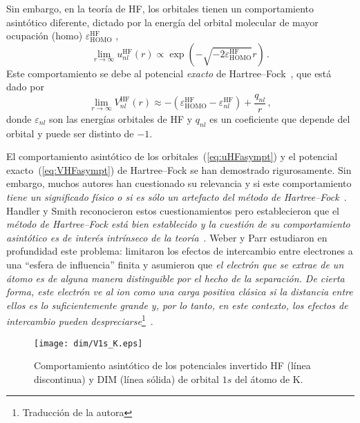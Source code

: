 Sin embargo, en la teoría de HF, los orbitales tienen un comportamiento 
asintótico diferente, dictado por la energía del orbital molecular de 
mayor ocupación (\acs{homo}) $\varepsilon_{\mathrm{HOMO}}^{\mathrm{HF}}$ 
\cite{Handy:69,Handler:80,Ishida:92},
\begin{equation}
\lim_{r \rightarrow \infty} u_{nl}^{\mathrm{HF}}(r) \propto
\exp(- \sqrt{- 2 \varepsilon_{\mathrm{HOMO}}^{\mathrm{HF}} } r )  \, .
\label{eq:uHFasympt}
\end{equation}
Este comportamiento se debe al potencial \textit{exacto} de 
Hartree--Fock~\cite{Cinal:10}, que está dado por
\begin{equation}
\lim_{r\rightarrow\infty} V_{nl}^{\mathrm{HF}}(r) \approx
-\left(\varepsilon_{\mathrm{HOMO}}^{\mathrm{HF}}
-\varepsilon_{nl}^{\mathrm{HF}}\right)+\frac{q_{nl}}{r}\,,
\label{eq:VHFasympt}
\end{equation}
donde $\varepsilon_{nl}$ son las energías orbitales de HF y $q_{nl}$ es 
un coeficiente que depende del orbital y puede ser distinto de $-1$.

El comportamiento asintótico de los orbitales~(\ref{eq:uHFasympt}) y el 
potencial exacto~(\ref{eq:VHFasympt}) de Hartree--Fock se han demostrado 
rigurosamente. Sin embargo, muchos autores han cuestionado su relevancia 
y si este comportamiento \textit{tiene un significado físico o si es 
sólo un artefacto del método de Hartree--Fock}\myfnote{}~\cite{Handy:69}. 
Handler y Smith reconocieron estos cuestionamientos pero establecieron 
que el \textit{método de Hartree--Fock está bien establecido y la 
cuestión de su comportamiento asintótico es de interés intrínseco de la
teoría}\myfnote{}~\cite{Handler:80}.
Weber y Parr estudiaron en profundidad este problema: limitaron los 
efectos de intercambio entre electrones a una ``esfera de influencia''
finita y asumieron que \textit{el electrón que se extrae de un átomo es 
de alguna manera distinguible por el hecho de la separación. De cierta 
forma, este electrón ve al ion como una carga positiva clásica si la 
distancia entre ellos es lo suficientemente grande y, por lo tanto, en 
este contexto, los efectos de intercambio pueden 
despreciarse}\footnote{Traducción de la autora}~\cite{Weber:71}.

\begin{figure}
\centering
\texttt{[image: dim/V1s\_K.eps]} 
\caption[Comportamiento asintótico de los potenciales.]
{Comportamiento asintótico de los potenciales invertido HF (línea 
discontinua) y DIM (línea sólida) de orbital $1s$ del átomo de K.}
\label{fig:V1sK}
\end{figure}

